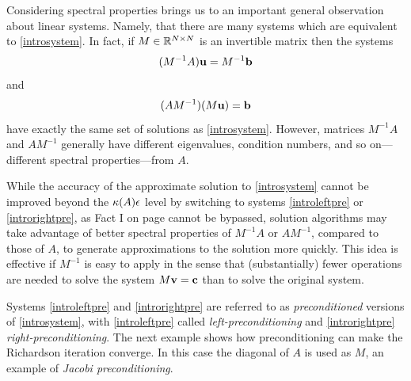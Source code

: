 Considering spectral properties brings us to an important general observation about linear systems.  Namely, that there are many systems which are equivalent to \eqref{introsystem}.  In fact, if $M\in\mathbb{R}^{N\times N}$ is an invertible matrix then the systems
\begin{equation}
(M^{-1} A) \mathbf{u} = M^{-1} \mathbf{b} \label{introleftpre}
\end{equation}
and
\begin{equation}
(A M^{-1}) (M\mathbf{u}) = \mathbf{b} \label{introrightpre}
\end{equation}
have exactly the same set of solutions as \eqref{introsystem}.  However, matrices $M^{-1} A$ and $A M^{-1}$ generally have different eigenvalues, condition numbers, and so on---different spectral properties---from $A$.

While the accuracy of the approximate solution to \eqref{introsystem} cannot be improved beyond the $\kappa(A) \epsilon$ level by switching to systems \eqref{introleftpre} or \eqref{introrightpre}, as Fact I on page \pageref{page:ls:limittoaccuracy} cannot be bypassed, solution algorithms may take advantage of better spectral properties of $M^{-1} A$ or $A M^{-1}$, compared to those of $A$, to generate approximations to the solution more quickly.  This idea is effective if $M^{-1}$ is easy to apply in the sense that (substantially) fewer operations are needed to solve the system $M\mathbf{v}=\mathbf{c}$ than to solve the original system.

Systems \eqref{introleftpre} and \eqref{introrightpre} are referred to as \emph{preconditioned} versions of \eqref{introsystem}, with \eqref{introleftpre} called \emph{left-preconditioning} and \eqref{introrightpre} \emph{right-preconditioning}.  The next example shows how preconditioning can make the Richardson iteration converge.  In this case the diagonal of $A$ is used as $M$, an example of \emph{Jacobi preconditioning}.

